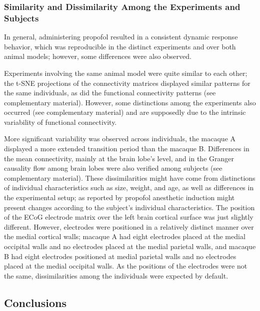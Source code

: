 \documentclass[twoside]{article}
\begin{document}
\begin{multicols}{2}
\subsubsection{Similarity and Dissimilarity Among the Experiments and Subjects}


In general, administering propofol resulted in a consistent dynamic response behavior, which was reproducible in the distinct experiments and over both animal models; however, some differences were also observed. 

Experiments involving the same animal model were quite similar to each other; the t-SNE projections of the connectivity matrices displayed similar patterns for the same individuals, as did the functional connectivity patterns (see complementary material). However, some distinctions among the experiments also occurred (see complementary material) and are supposedly due to the intrinsic variability of functional connectivity.

More significant variability was observed across individuals, the macaque A displayed a more extended transition period than the macaque B. Differences in the mean connectivity, mainly at the brain lobe's level, and in the Granger causality flow among brain lobes were also verified among subjects (see complementary material). These dissimilarities might have come from distinctions of individual characteristics such as size, weight, and age, as well as differences in the experimental setup; as reported by \citep{wang2012memory} propofol anesthetic induction might present changes according to the subject's individual characteristics. The position of the ECoG electrode matrix over the left brain cortical surface was just slightly different. However, electrodes were positioned in a relatively distinct manner over the medial cortical walls; macaque A had eight electrodes placed at the medial occipital walls and no electrodes placed at the medial parietal walls, and macaque B had eight electrodes positioned at medial parietal walls and no electrodes placed at the medial occipital walls. As the positions of the electrodes were not the same, dissimilarities among the individuals were expected by default.

\enlargethispage{\baselineskip}


\subsection{Conclusions}



\end{multicols}
\end{document}
